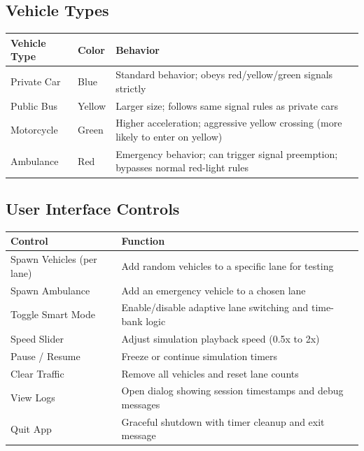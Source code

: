 \documentclass[12pt,a4paper]{article}
\begin{document}
\subsection{Vehicle Types}
\begin{table}[h]
    \centering
    \begin{tabularx}{\textwidth}{|l|l|X|}
        \hline
        \textbf{Vehicle Type} & \textbf{Color} & \textbf{Behavior} \\ \hline
        Private Car & Blue & Standard behavior; obeys red/yellow/green signals strictly \\ \hline
        Public Bus & Yellow & Larger size; follows same signal rules as private cars \\ \hline
        Motorcycle & Green & Higher acceleration; aggressive yellow crossing (more likely to enter on yellow) \\ \hline
        Ambulance & Red & Emergency behavior; can trigger signal preemption; bypasses normal red-light rules \\ \hline
    \end{tabularx}
\end{table}

\subsection{User Interface Controls}
\begin{table}[h]
    \centering
    \begin{tabularx}{\textwidth}{|l|X|}
        \hline
        \textbf{Control} & \textbf{Function} \\ \hline
        Spawn Vehicles (per lane) & Add random vehicles to a specific lane for testing \\ \hline
        Spawn Ambulance & Add an emergency vehicle to a chosen lane \\ \hline
        Toggle Smart Mode & Enable/disable adaptive lane switching and time-bank logic \\ \hline
        Speed Slider & Adjust simulation playback speed (0.5x to 2x) \\ \hline
        Pause / Resume & Freeze or continue simulation timers \\ \hline
        Clear Traffic & Remove all vehicles and reset lane counts \\ \hline
        View Logs & Open dialog showing session timestamps and debug messages \\ \hline
        Quit App & Graceful shutdown with timer cleanup and exit message \\ \hline
    \end{tabularx}
\end{table}
\end{document}
